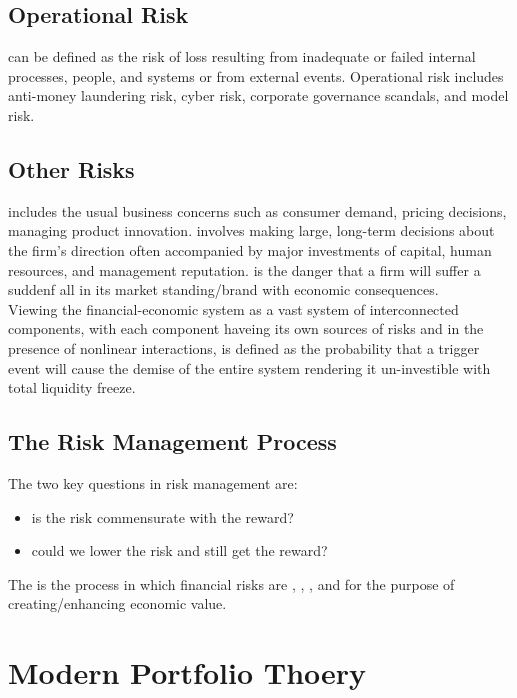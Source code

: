 \documentclass{article}
\begin{document}
\subsection{Operational Risk}

 can be defined as the risk of loss resulting from inadequate or failed internal processes, people, and systems or from external events. Operational risk includes anti-money laundering risk, cyber risk, corporate governance scandals, and model risk. 

\subsection{Other Risks}

 includes the usual business concerns such as consumer demand, pricing decisions, managing product innovation.  involves making large, long-term decisions about the firm's direction often accompanied by major investments of capital, human resources, and management reputation.  is the danger that a firm will suffer a suddenf all in its market standing/brand with economic consequences. \\ 

Viewing the financial-economic system as a vast system of interconnected components, with each component haveing its own sources of risks and in the presence of nonlinear interactions,  is defined as the probability that a trigger event will cause the demise of the entire system rendering it un-investible with total liquidity freeze. 

\subsection{The Risk Management Process}

The two key questions in risk management are:
\begin{itemize}
  \item is the risk commensurate with the reward?
  \item could we lower the risk and still get the reward?
\end{itemize}
The  is the process in which financial risks are , , , and  for the purpose of creating/enhancing economic value. 

\section{Modern Portfolio Thoery}
\end{document}
